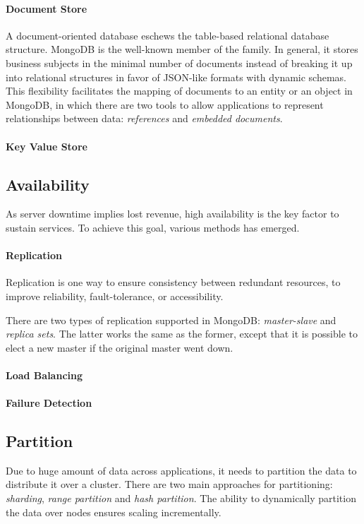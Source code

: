 \documentclass[12pt,letter]{article}
\begin{document}
\paragraph*{Document Store}
A document-oriented database eschews the table-based relational database structure. MongoDB is the well-known member of the family. In general, it stores business subjects in the minimal number of documents instead of breaking it up into relational structures\citep{Hoberman2014} in favor of JSON-like formats with dynamic schemas.\citep{Suter2012} This flexibility facilitates the mapping of documents to an entity or an object in MongoDB, in which there are two tools to allow applications to represent relationships between data: \textit{references} and \textit{embedded documents}.\citep{MongoDBInc.2009}

\paragraph*{Key Value Store}


\subsection{Availability}
As server downtime implies lost revenue, high availability is the key factor to sustain services. To achieve this goal, various methods has emerged.

\paragraph*{Replication}
Replication is one way to ensure consistency between redundant resources, to improve reliability, fault-tolerance, or accessibility. 


There are two types of replication supported in MongoDB: \textit{master-slave} and \textit{replica sets}.\citep{Suter2012} The latter works the same as the former, except that it is possible to elect a new master if the original master went down.

\paragraph*{Load Balancing} 

\paragraph*{Failure Detection}

\subsection{Partition}
Due to huge amount of data across applications, it needs to partition the data to distribute it over a cluster. There are two main approaches for partitioning: \textit{sharding}, \textit{range partition} and \textit{hash partition}. The ability to dynamically partition the data over nodes ensures scaling incrementally. 
\end{document}
